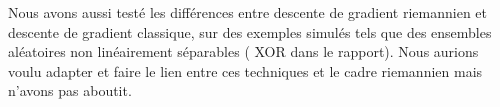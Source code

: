 \documentclass{article}
\begin{document}
Nous avons aussi testé les différences entre descente de gradient riemannien et descente de gradient classique, sur des exemples simulés tels que des ensembles aléatoires non linéairement séparables ( XOR dans le rapport). Nous aurions voulu adapter et faire le lien entre ces techniques et le cadre riemannien mais n'avons pas aboutit. \\




 
\nocite{*}
\end{document}
